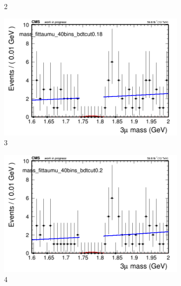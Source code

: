 \begin{figure}[h!]
\begin{subfigure}{0.2\textwidth}
        \caption{2}
    \end{subfigure}
    \begin{subfigure}{0.2\textwidth}
        \includegraphics[width=\textwidth]{unfixed_exp/plots/taumu/massfit_taumu_40bins_bdtcut0.18.png}
        \caption{3}
    \end{subfigure}
    \begin{subfigure}{0.2\textwidth}
        \includegraphics[width=\textwidth]{unfixed_exp/plots/taumu/massfit_taumu_40bins_bdtcut0.2.png}
        \caption{4}
    \end{subfigure}
    \begin{subfigure}{0.2\textwidth}

\end{subfigure}
\end{figure}
